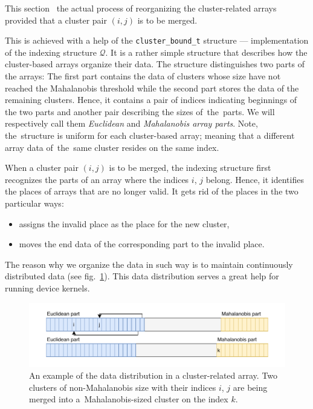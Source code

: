 This section \ the actual process of reorganizing the cluster-related arrays provided that a cluster pair $(i,j)$ is to be merged.

This is achieved with a help of the \texttt{cluster\_bound\_t} structure ---  implementation of the indexing structure $\mathcal{Q}$. It is a rather simple structure that describes how the cluster-based arrays organize their data. The structure distinguishes two parts of the arrays: The first part contains the data of clusters whose size have not reached the Mahalanobis threshold while the second part stores the data of the remaining clusters. Hence, it contains a pair of indices indicating beginnings of the two parts and another pair describing the sizes of~the~parts. We will respectively call them \emph{Euclidean} and \emph{Mahalanobis array parts}. Note, the~structure is uniform for each cluster-based array; meaning that a different array data of~the~same cluster resides on the same index.

When a cluster pair $(i,j)$ is to be merged, the indexing structure first recognizes the parts of an array where the indices $i$, $j$ belong. Hence, it identifies the places of arrays that are no longer valid. It gets rid of the places in the two particular ways:
\begin{itemize}
	\item assigns the invalid place as the place for the new cluster,
	\item moves the end data of the corresponding part to the invalid place.
\end{itemize}
The reason why we organize the data in such way is to maintain continuously distributed data (see fig.~\ref{fig03:data_order}). This data distribution serves a great help for running device kernels.

\begin{figure}\centering
	\includegraphics[width=\textwidth]{img/data}
	\caption{An example of the data distribution in a cluster-related array. Two clusters of non-Mahalanobis size with their indices $i$, $j$ are being merged into a~Mahalanobis-sized cluster on the index $k$.}
	\label{fig03:data_order}
\end{figure}

